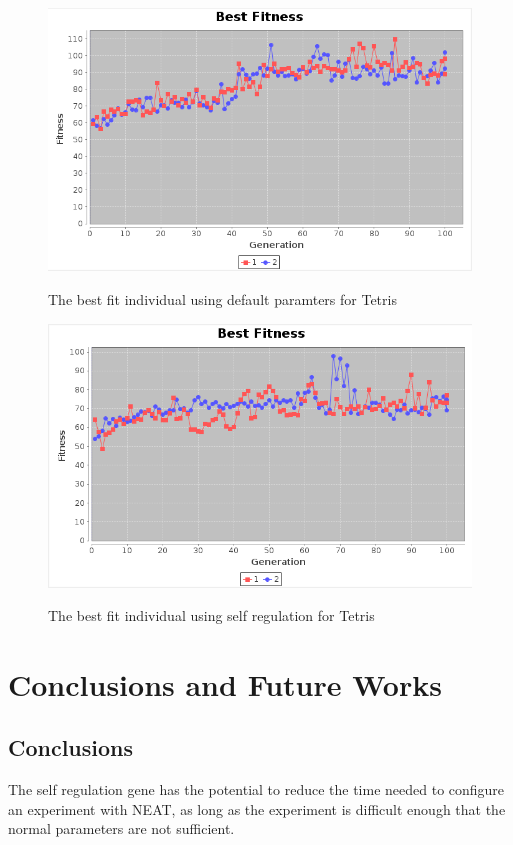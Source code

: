 \documentclass[12pt]{ucthesis} \newif\ifpdf \ifx\pdfoutput\undefined
\begin{document}
\begin{figure}[h!]
  \caption{The best fit individual using default paramters for Tetris}
  \centering
    \includegraphics[width=1\textwidth]{graphstetris/default_best.png}
   \label{fig:default_best_tetris} 
\end{figure}
 
\begin{figure}[h!]
  \caption{The best fit individual using self regulation for Tetris}
  \centering
    \includegraphics[width=1\textwidth]{graphstetris/self_reg_best.png}
   \label{fig:self_best_tetris} 
\end{figure}


\chapter{Conclusions and Future Works}
\section{Conclusions}
The self regulation gene has the potential to reduce the time needed to
configure an experiment with NEAT, as long as the experiment is difficult enough
that the normal parameters are not sufficient.
\end{document}
